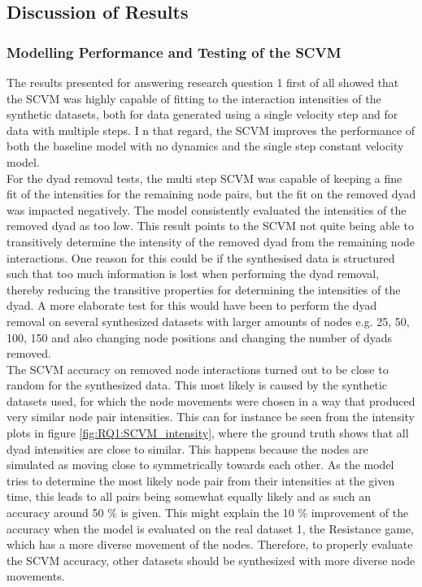 \subsection{Discussion of Results}
\label{sec:Discussion:Results}


\subsubsection{Modelling Performance and Testing of the SCVM}
\label{sec:Discussion:Results:ModellingPerformance}

The results presented for answering research question 1 first of all showed that the SCVM was highly capable of fitting to the interaction intensities of the synthetic datasets, both for data generated using a single velocity step and for data with multiple steps. I
n that regard, the SCVM improves the performance of both the baseline model with no dynamics and the single step constant velocity model. 
\\
For the dyad removal tests, the multi step SCVM was capable of keeping a fine fit of the intensities for the remaining node pairs, but the fit on the removed dyad was impacted negatively. 
The model consistently evaluated the intensities of the removed dyad as too low. 
This result points to the SCVM not quite being able to transitively determine the intensity of the removed dyad from the remaining node interactions. 
One reason for this could be if the synthesised data is structured such that too much information is lost when performing the dyad removal, thereby reducing the transitive properties for determining the intensities of the dyad. 
A more elaborate test for this would have been to perform the dyad removal on several synthesized datasets with larger amounts of nodes e.g. 25, 50, 100, 150 and also changing node positions and changing the number of dyads removed.
\\
The SCVM accuracy on removed node interactions turned out to be close to random for the synthesized data. 
This most likely is caused by the synthetic datasets used, for which the node movements were chosen in a way that produced very similar node pair intensities. 
This can for instance be seen from the intensity plots in figure \ref{fig:RQ1:SCVM_intensity}, where the ground truth shows that all dyad intensities are close to similar. 
This happens because the nodes are simulated as moving close to symmetrically towards each other. 
As the model tries to determine the most likely node pair from their intensities at the given time, this leads to all pairs being somewhat equally likely and as such an accuracy around 50 \% is given. 
This might explain the 10 \% improvement of the accuracy when the model is evaluated on the real dataset 1, the Resistance game, which has a more diverse movement of the nodes.
Therefore, to properly evaluate the SCVM accuracy, other datasets should be synthesized with more diverse node movements.  


